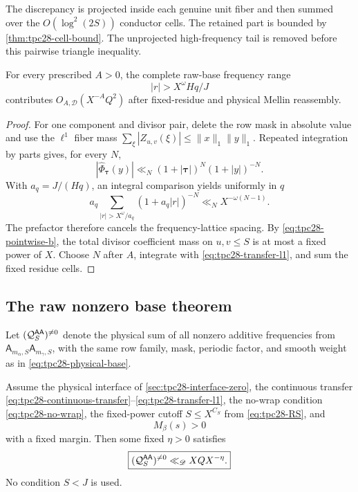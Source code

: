 The discrepancy is projected inside each genuine unit fiber and then
summed over the $O(\log^2(2S))$ conductor cells.  The retained part is
bounded by \cref{thm:tpc28-cell-bound}.  The unprojected high-frequency
tail is removed before this pairwise triangle inequality.

\begin{lemma}
\label{lem:tpc28-Fourier-tail}
For every prescribed $A>0$, the complete raw-base frequency range
\begin{equation}
 |r|>X^\omega Hq/J
 \label{eq:tpc28-tail-range}
\end{equation}
contributes $O_{A,\mathscr D}(X^{-A}Q^2)$ after fixed-residue and
physical Mellin reassembly.
\end{lemma}

\begin{proof}
For one component and divisor pair, delete the row mask in absolute
value and use the $\ell^1$ fiber mass
\(\sum_\xi|Z_{u,v}(\xi)|\le\|x\|_1\|y\|_1\).  Repeated integration by
parts gives, for every $N$,
\[
 |\widehat\Phi_{\boldsymbol\tau}(y)|
 \ll_N(1+|\boldsymbol\tau|)^N(1+|y|)^{-N}.
\]
With $a_q=J/(Hq)$, an integral comparison yields uniformly in $q$
\begin{equation}
 a_q\sum_{|r|>X^\omega/a_q}(1+a_q|r|)^{-N}
 \ll_NX^{-\omega(N-1)}.
 \label{eq:tpc28-tail-lattice}
\end{equation}
The prefactor therefore cancels the frequency-lattice spacing.  By
\eqref{eq:tpc28-pointwise-b}, the total divisor coefficient mass on
$u,v\le S$ is at most a fixed power of $X$.  Choose $N$ after
$A$, integrate with \eqref{eq:tpc28-transfer-l1}, and sum the fixed
residue cells.
\end{proof}

\subsection{The raw nonzero base theorem}

Let $(\mathcal Q_S^{\mathsf A\mathsf A})^{\ne0}$ denote the physical sum of
all nonzero additive frequencies from
$\mathsf A_{m_\alpha,S}\mathsf A_{m_\gamma,S}$, with the same row
family, mask, periodic factor, and smooth weight as in
\eqref{eq:tpc28-physical-base}.

\begin{theorem}
\label{thm:tpc28-raw-nonzero}
Assume the physical interface of \cref{sec:tpc28-interface-zero}, the
continuous transfer
\eqref{eq:tpc28-continuous-transfer}--\eqref{eq:tpc28-transfer-l1},
the no-wrap condition \eqref{eq:tpc28-no-wrap}, the fixed-power cutoff
$S\le X^{C_S}$ from \eqref{eq:tpc28-RS}, and
\begin{equation}
 M_\beta(s)>0
 \label{eq:tpc28-positive-base-ledger}
\end{equation}
with a fixed margin.  Then some fixed $\eta>0$ satisfies
\begin{equation}
 \boxed{
 (\mathcal Q_S^{\mathsf A\mathsf A})^{\ne0}
 \ll_{\mathscr D}XQX^{-\eta}.}
 \label{eq:tpc28-raw-nonzero-closure}
\end{equation}
No condition $S<J$ is used.
\end{theorem}

